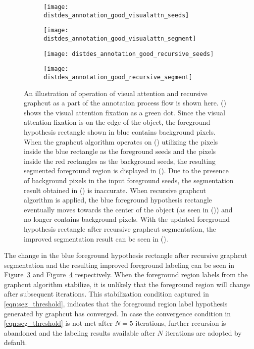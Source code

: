 %
%
\begin{figure*}
  \centering
  \begin{subfigure}[]{0.2\textwidth}
      \texttt{[image: distdes\_annotation\_good\_visualattn\_seeds]}
      \caption{}
      \label{fig:good_seg_visualattn_seeds}
  \end{subfigure}
  \begin{subfigure}[]{0.2\textwidth}
      \texttt{[image: distdes\_annotation\_good\_visualattn\_segment]}
      \caption{}
      \label{fig:good_seg_visualattn_seg}
  \end{subfigure}
  \begin{subfigure}[]{0.2\textwidth}
      \texttt{[image: distdes\_annotation\_good\_recursive\_seeds]}
      \caption{}
      \label{fig:good_seg_recursive_seeds}
  \end{subfigure}
  \begin{subfigure}[]{0.2\textwidth}
      \texttt{[image: distdes\_annotation\_good\_recursive\_segment]}
      \caption{}
      \label{fig:good_seg_recursive_seg}
  \end{subfigure}
\caption[Illustration of annotation process flow]{An illustration of operation of visual attention and recursive graphcut as a part of the annotation process flow is shown here. () shows the visual attention fixation as a green dot. Since the visual attention fixation is on the edge of the object, the foreground hypothesis rectangle shown in blue contains background pixels. When the graphcut algorithm operates on () utilizing the pixels inside the blue rectangle as the foreground seeds and the pixels inside the red rectangles as the background seeds, the resulting segmented foreground region is displayed in (). Due to the presence of background pixels in the input foreground seeds, the segmentation result obtained in () is inaccurate. When recursive graphcut algorithm is 
applied, the blue foreground hypothesis rectangle eventually moves towards the center of the object (as seen in ()) and no longer contains background pixels. With the updated foreground hypothesis rectangle after recursive graphcut segmentation, the improved segmentation result can be seen in ().}
\label{fig:annotation_good_seg}
\end{figure*}	
%
The change in the blue foreground hypothesis rectangle after recursive graphcut segmentation and the resulting improved foreground labeling can be seen in Figure~\ref{fig:good_seg_recursive_seeds} and Figure~\ref{fig:good_seg_recursive_seg} respectively.
When the foreground region labels from the graphcut algorithm stabilize, it is unlikely that the foreground region will change after subsequent iterations. This stabilization condition captured in \eqref{eqn:seg_threshold}, indicates that the foreground region label hypothesis generated by graphcut has converged. In case the convergence condition in \eqref{eqn:seg_threshold} is not met after $N=5$ iterations, further recursion is abandoned and the labeling results available after $N$ iterations are adopted by default.

